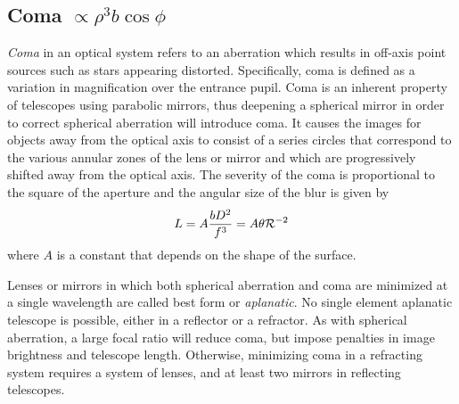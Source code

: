 
\subsection{Coma $\propto \rho^3b\cos\phi$}

{\it Coma} in an optical system refers to an aberration which results
in off-axis point sources such as stars appearing distorted. Specifically, 
coma is defined as a variation in magnification over the entrance pupil. 
Coma is an inherent property of telescopes using parabolic mirrors, thus
deepening a spherical mirror in order to correct spherical aberration will
introduce coma. It causes the images for objects away from the optical axis
to consist of a series circles that correspond to the various annular 
zones of the lens or mirror and which are progressively shifted away from 
the optical axis. The severity of the coma is proportional to the square of
the aperture and the angular size of the blur is given by
\[ 
L=A{bD^2\over f^3}=A\theta{\cal R}^{-2}
\]
where $A$ is a constant that depends on the shape of the surface.



Lenses or mirrors in which both spherical aberration and coma are minimized at a single
wavelength are called best form or {\it aplanatic}. No single element aplanatic telescope
is possible, either in a reflector or a refractor. As with spherical aberration, a large
focal ratio will reduce coma, but impose penalties in image brightness and telescope length.
Otherwise, minimizing coma in a refracting system requires a system of lenses, and at least
two mirrors in reflecting telescopes.

